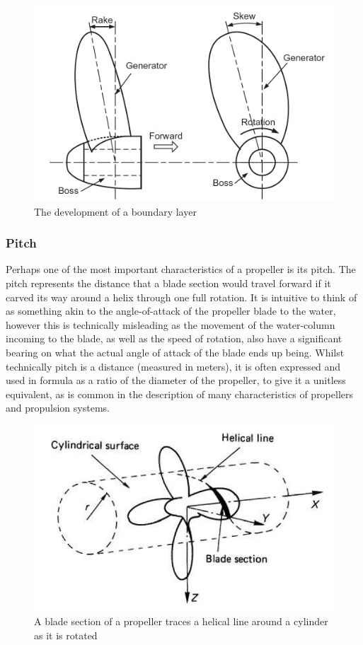 \documentclass{article}\usepackage[]{graphicx}\usepackage[]{color}
\begin{document}
\begin{figure}
\includegraphics[width=\textwidth]{SkewRake.png}
\caption{The development of a boundary layer \parencite[262]{mollard2011}}
\label{fig:SkewRake.png}
\end{figure}

\subsubsection{Pitch}
Perhaps one of the most important characteristics of a propeller is its pitch.  The pitch represents the distance that a blade section would travel forward if it carved its way around a helix through one full rotation.  It is intuitive to think of as something akin to the angle-of-attack of the propeller blade to the water, however this is technically misleading as the movement of the water-column incoming to the blade, as well as the speed of rotation, also have a significant bearing on what the actual angle of attack of the blade ends up being.  Whilst technically pitch is a distance (measured in meters), it is often expressed and used in formula as a ratio of the diameter of the propeller, to give it a unitless equivalent, as is common in the description of many characteristics of propellers and propulsion systems.

\begin{figure}
\includegraphics[width=\textwidth]{HelicalLine.png}
\caption{A blade section of a propeller traces a helical line around a cylinder as it is rotated \parencite{carlton2007}}
\label{fig:HelicalLine.png}
\end{figure}
\end{document}
